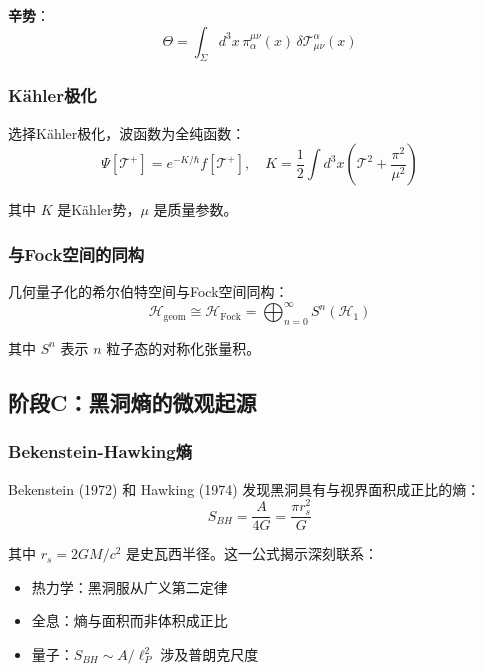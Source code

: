 \textbf{辛势}：
\begin{equation}
\Theta = \int_\Sigma d^3x \, \pi_\alpha^{\mu\nu}(x) \, \delta \mathcal{T}_{\mu\nu}^\alpha(x)
\end{equation}

\subsubsection{Kähler极化}

选择Kähler极化，波函数为全纯函数：
\begin{equation}
\Psi[\mathcal{T}^+] = e^{-K/\hbar} f[\mathcal{T}^+], \quad K = \frac{1}{2}\int d^3x \left(\mathcal{T}^2 + \frac{\pi^2}{\mu^2}\right)
\end{equation}

其中 $K$ 是Kähler势，$\mu$ 是质量参数。

\subsubsection{与Fock空间的同构}

几何量子化的希尔伯特空间与Fock空间同构：
\begin{equation}
\mathcal{H}_{\text{geom}} \cong \mathcal{H}_{\text{Fock}} = \bigoplus_{n=0}^\infty S^n(\mathcal{H}_1)
\end{equation}

其中 $S^n$ 表示 $n$ 粒子态的对称化张量积。

\subsection{阶段C：黑洞熵的微观起源}
\label{subsec:stageC_entropy}

\subsubsection{Bekenstein-Hawking熵}

Bekenstein (1972) 和 Hawking (1974) 发现黑洞具有与视界面积成正比的熵：
\begin{equation}
S_{BH} = \frac{A}{4G} = \frac{\pi r_s^2}{G}
\end{equation}

其中 $r_s = 2GM/c^2$ 是史瓦西半径。这一公式揭示深刻联系：
\begin{itemize}
    \item 热力学：黑洞服从广义第二定律
    \item 全息：熵与面积而非体积成正比
    \item 量子：$S_{BH} \sim A/\ell_P^2$ 涉及普朗克尺度
\end{itemize}

